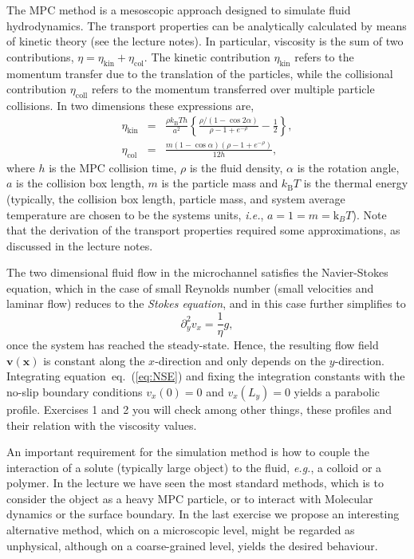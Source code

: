 \documentclass[sizes,12pt,nftimes]{article}
\begin{document}
The MPC method is a mesoscopic approach designed to simulate fluid
hydrodynamics. The transport properties can be analytically calculated
by means of kinetic theory (see the lecture notes). In particular,
viscosity is the sum of two contributions, $\eta = \eta_\mathrm{kin} +
\eta_\mathrm{col}$. The kinetic contribution $\eta_\mathrm{kin}$
refers to the momentum transfer due to the translation of the
particles, while the collisional contribution $\eta_\mathrm{coll}$
refers to the momentum transferred over multiple particle collisions. 
In two dimensions these expressions are,
\begin{eqnarray}
    \eta_\mathrm{kin} &=& \frac{\rho k_\mathrm{B}T h}{a^2} \left\{ 
       \frac{\rho/\left( 1 - \cos 2\alpha \right)}{\rho - 1 + e^{-\rho}} - \frac{1}{2} \right\}, 
        \nonumber \\ \label{eq:eta}
    \eta_\mathrm{col} &=& \frac{m \left( 1 - \cos \alpha \right) \left( \rho - 1 + e^{-\rho} \right)}{12 h},
\end{eqnarray}
where $h$ is the MPC collision time, $\rho$ is the fluid density,
$\alpha$ is the rotation angle, $a$ is the collision box length, $m$
is the particle mass and $k_\mathrm{B}T$ is the thermal energy
(typically, the collision box length, particle mass, and system
average temperature are chosen to be the systems units, \emph{i.e.},
$a = 1 = m = {\mathrm k}_B T$). Note that the derivation of the
transport properties required some approximations, as discussed in the
lecture notes.
  
The two dimensional fluid flow in the microchannel satisfies the
Navier-Stokes equation, which in the case of small Reynolds number
(small velocities and laminar flow) reduces to the {\em Stokes
equation}, and in this case further simplifies to
  \begin{equation}
    \label{eq:NSE}
    \partial_y^2 v_x = \frac{1}{\eta} g,
  \end{equation}
once the system has reached the steady-state. Hence, the resulting
  flow field $\bm{v}(\bm{x})$ is constant along the $x$-direction and
  only depends on the $y$-direction. Integrating
  equation~eq.~(\ref{eq:NSE}) and fixing the integration constants
  with the no-slip boundary conditions $v_x(0)=0$ and $v_x(L_y)=0$
  yields a parabolic profile. Exercises 1 and 2 you will check  among other things, these 
profiles and their relation with the viscosity values. 
  
\vspace*{0.2cm} An important requirement for the simulation method is
how to couple the interaction of a solute (typically large object) to
the fluid, \emph{e.g.}, a colloid or a polymer.  In the lecture we
have seen the most standard methods, which is to consider the object
as a heavy MPC particle, or to interact with Molecular dynamics or the
surface boundary. In the last exercise we propose an interesting
alternative method, which on a microscopic level, might be regarded as
unphysical, although on a coarse-grained level, yields the desired
behaviour.
  
\end{document}
